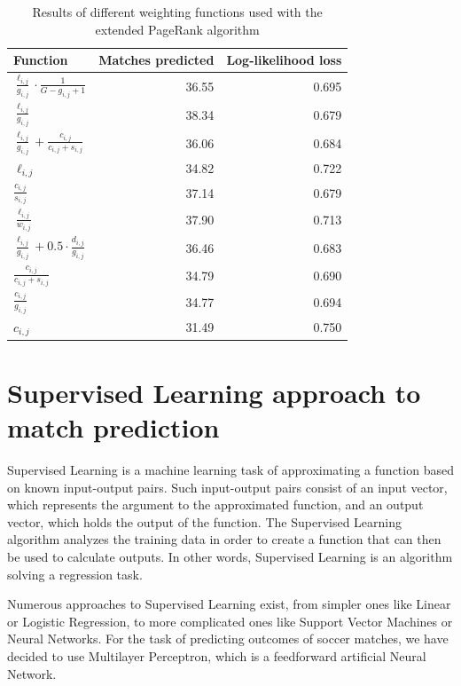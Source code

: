 \vspace{1em}
\begin{table}[H]
\caption{Results of different weighting functions used with the extended PageRank algorithm}
\label{table:pagerank_results}
\begin{tabular}{| l | r | r |}
\hline
\textbf{Function} & \textbf{Matches predicted} & \textbf{Log-likelihood loss} \\ \hline
$\frac{\ell_{i,j}}{g_{i,j}}\cdot \frac{1}{G-g_{i,j}+1}$ &  36.55 & 0.695 \\ \hline
$\frac{\ell_{i,j}}{g_{i,j}}$ &  38.34 & 0.679 \\ \hline
$\frac{\ell_{i,j}}{g_{i,j}} + \frac{c_{i,j}}{c_{i,j}+s_{i,j}}$ &  36.06 & 0.684 \\ \hline
$\ell_{i,j}$ &  34.82 & 0.722 \\ \hline
$\frac{c_{i,j}}{s_{i,j}}$ &  37.14 & 0.679 \\ \hline
$\frac{\ell_{i,j}}{w_{i,j}}$ &  37.90 & 0.713 \\ \hline
$\frac{\ell_{i,j}}{g_{i,j}}+0.5\cdot \frac{d_{i,j}}{g_{i,j}}$ &  36.46 & 0.683 \\ \hline
$\frac{c_{i,j}}{c_{i,j}+s_{i,j}}$ &  34.79 & 0.690 \\ \hline
$\frac{c_{i,j}}{g_{i,j}}$ &  34.77 & 0.694 \\ \hline
$c_{i,j}$ & 31.49 & 0.750 \\ \hline
\end{tabular}
\end{table}

\section{Supervised Learning approach to match prediction}
Supervised Learning is a machine learning task of approximating a function based on known input-output pairs. Such input-output pairs consist of an input vector, which represents the argument to the approximated function, and an output vector, which holds the output of the function. The Supervised Learning algorithm analyzes the training data in order to create a function that can then be used to calculate outputs. In other words, Supervised Learning is an algorithm solving a regression task.

Numerous approaches to Supervised Learning exist, from simpler ones like Linear or Logistic Regression, to more complicated ones like Support Vector Machines or Neural Networks. For the task of predicting outcomes of soccer matches, we have decided to use Multilayer Perceptron, which is a feedforward artificial Neural Network.

